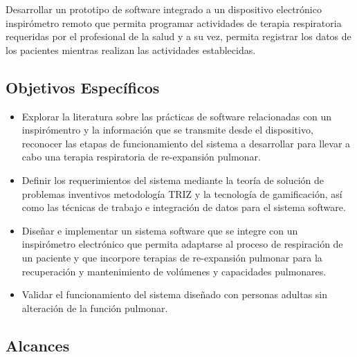 \documentclass[12pt]{article}
\begin{document}
Desarrollar un prototipo de software integrado a un dispositivo electr\'onico inspir\'ometro remoto que permita programar actividades de terapia respiratoria requeridas por el profesional de la salud y a su vez, permita registrar los datos de los pacientes mientras realizan las actividades establecidas.

\subsection{Objetivos Específicos}
\label{objetivoses}


\begin{itemize}
\item Explorar la literatura sobre las pr\'acticas de software relacionadas con un inspir\'omentro y la informaci\'on que se transmite desde el dispositivo, reconocer las etapas de funcionamiento del sistema a desarrollar para llevar a cabo una terapia respiratoria de  re-expansi\'on pulmonar.

\item Definir los requerimientos del sistema mediante la teor\'ia de soluci\'on de problemas inventivos metodolog\'ia TRIZ y la tecnolog\'ia de gamificaci\'on, as\'i como las t\'ecnicas de trabajo e integraci\'on de datos para el sistema software.

\item Dise\~{n}ar e implementar un sistema software que se integre con un inspir\'ometro electr\'onico que permita adaptarse al proceso de respiraci\'on de un paciente y que incorpore terapias de re-expansi\'on pulmonar para la recuperaci\'on y mantenimiento de vol\'umenes y capacidades pulmonares.


\item Validar el funcionamiento del sistema dise\~{n}ado con personas adultas sin alteraci\'on de la funci\'on pulmonar.  %

\end{itemize}

\subsection{Alcances}
\end{document}

